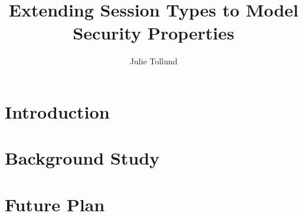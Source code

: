 \documentclass[a4paper,12pt]{report}
\title{Extending Session Types to Model Security Properties}
\author{Julie Tollund}
\begin{document}
\begin{spacing}{1}
\maketitle


\setlength{\cftbeforesecskip}{10pt}  %
\tableofcontents
\end{spacing}
\clearpage

\chapter{Introduction}


\chapter{Background Study}


\chapter{Future Plan}


\clearpage
{}
\appendix
\begin{spacing}{1}
\nocite{*}  %
\printbibliography[title={References}]
\begin{appendices}
%

\end{appendices}
\end{spacing}
\end{document}
